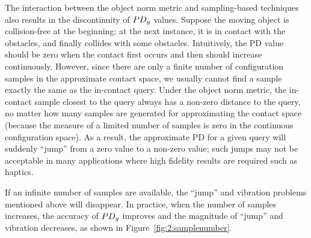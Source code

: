 The interaction between the object norm metric and sampling-based techniques also results in the discontinuity of $PD_g$ values. Suppose the moving object is collision-free at the beginning; at the next instance, it is in contact with the obstacles, and finally collides with some obstacles. Intuitively, the PD value should be zero when the contact first occurs and then should increase continuously. However, since there are only a finite number of configuration samples in the approximate contact space, we usually cannot find a sample exactly the same as the in-contact query. Under the object norm metric, the in-contact sample closest to the query always has a non-zero distance to the query, no matter how many samples are generated for approximating the contact space (because the measure of a limited number of samples is zero in the continuous configuration space). As a result, the approximate PD for a given query will suddenly ``jump'' from a zero value to a non-zero value; such jumps may not be acceptable in many applications where high fidelity results are required such as haptics. 

If an infinite number of samples are available, the ``jump'' and vibration problems mentioned above will disappear. In practice, when the number of samples increases, the accuracy of $PD_g$ improves and the magnitude of ``jump'' and vibration decreases, as shown in Figure~\ref{fig:2:samplenumber}.

